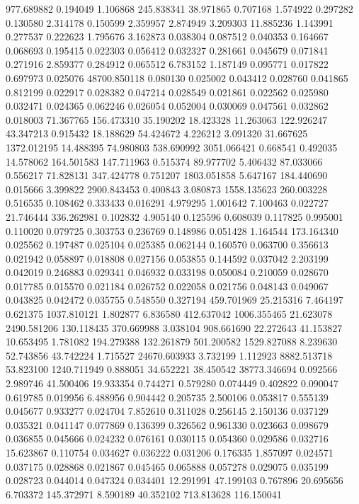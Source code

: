 977.689882
0.194049
1.106868
245.838341
38.971865
0.707168
1.574922
0.297282
0.130580
2.314178
0.150599
2.359957
2.874949
3.209303
11.885236
1.143991
0.277537
0.222623
1.795676
3.162873
0.038304
0.087512
0.040353
0.164667
0.068693
0.195415
0.022303
0.056412
0.032327
0.281661
0.045679
0.071841
0.271916
2.859377
0.284912
0.065512
6.783152
1.187149
0.095771
0.017822
0.697973
0.025076
48700.850118
0.080130
0.025002
0.043412
0.028760
0.041865
0.812199
0.022917
0.028382
0.047214
0.028549
0.021861
0.022562
0.025980
0.032471
0.024365
0.062246
0.026054
0.052004
0.030069
0.047561
0.032862
0.018003
71.367765
156.473310
35.190202
18.423328
11.263063
122.926247
43.347213
0.915432
18.188629
54.424672
4.226212
3.091320
31.667625
1372.012195
14.488395
74.980803
538.690992
3051.066421
0.668541
0.492035
14.578062
164.501583
147.711963
0.515374
89.977702
5.406432
87.033066
0.556217
71.828131
347.424778
0.751207
1803.051858
5.647167
184.440690
0.015666
3.399822
2900.843453
0.400843
3.080873
1558.135623
260.003228
0.516535
0.108462
0.333433
0.016291
4.979295
1.001642
7.100463
0.022727
21.746444
336.262981
0.102832
4.905140
0.125596
0.608039
0.117825
0.995001
0.110020
0.079725
0.303753
0.236769
0.148986
0.051428
1.164544
173.164340
0.025562
0.197487
0.025104
0.025385
0.062144
0.160570
0.063700
0.356613
0.021942
0.058897
0.018808
0.027156
0.053855
0.144592
0.037042
2.203199
0.042019
0.246883
0.029341
0.046932
0.033198
0.050084
0.210059
0.028670
0.017785
0.015570
0.021184
0.026752
0.022058
0.021756
0.048143
0.049067
0.043825
0.042472
0.035755
0.548550
0.327194
459.701969
25.215316
7.464197
0.621375
1037.810121
1.802877
6.836580
412.637042
1006.355465
21.623078
2490.581206
130.118435
370.669988
3.038104
908.661690
22.272643
41.153827
10.653495
1.781082
194.279388
132.261879
501.200582
1529.827088
8.239630
52.743856
43.742224
1.715527
24670.603933
3.732199
1.112923
8882.513718
53.823100
1240.711949
0.888051
34.652221
38.450542
38773.346694
0.092566
2.989746
41.500406
19.933354
0.744271
0.579280
0.074449
0.402822
0.090047
0.619785
0.019956
6.488956
0.904442
0.205735
2.500106
0.053817
0.555139
0.045677
0.933277
0.024704
7.852610
0.311028
0.256145
2.150136
0.037129
0.035321
0.041147
0.077869
0.136399
0.326562
0.961330
0.023663
0.098679
0.036855
0.045666
0.024232
0.076161
0.030115
0.054360
0.029586
0.032716
15.623867
0.110754
0.034627
0.036222
0.031206
0.176335
1.857097
0.024571
0.037175
0.028868
0.021867
0.045465
0.065888
0.057278
0.029075
0.035199
0.028723
0.044014
0.047324
0.034401
12.291991
47.199103
0.767896
20.695656
6.703372
145.372971
8.590189
40.352102
713.813628
116.150041
